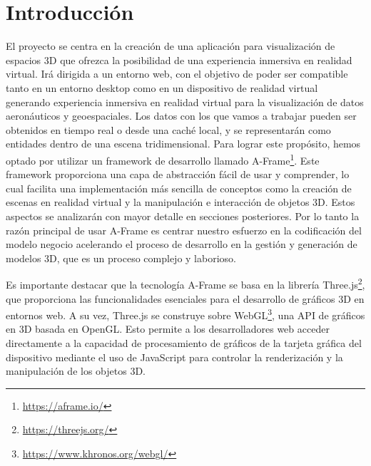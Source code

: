 \documentclass[a4paper, 11pt]{book}
\begin{document}

\cleardoublepage
\chapter{Introducción}
\label{sec:intro} %
El proyecto se centra en la creación de una aplicación para visualización de espacios 3D que ofrezca la posibilidad de una experiencia inmersiva en realidad virtual. Irá dirigida a un entorno web, con el objetivo de poder ser compatible tanto en un entorno desktop como en un dispositivo de realidad virtual generando experiencia inmersiva en realidad virtual para la visualización de datos aeronáuticos y geoespaciales. 
Los datos con los que vamos a trabajar pueden ser obtenidos en tiempo real o desde una caché local, y se representarán como entidades dentro de una escena tridimensional.
Para lograr este propósito, hemos optado por utilizar un \Gls{framework} de desarrollo llamado A-Frame\footnote{\url{https://aframe.io/}}. Este framework proporciona una capa de abstracción fácil de usar y comprender, lo cual facilita una implementación más sencilla de conceptos como la creación de escenas en realidad virtual y la manipulación e interacción de objetos 3D. Estos aspectos se analizarán con mayor detalle en secciones posteriores. Por lo tanto la razón principal de usar A-Frame es centrar nuestro esfuerzo en la codificación del modelo negocio acelerando el proceso de desarrollo en la gestión y generación de modelos 3D, que es un proceso complejo y laborioso.

Es importante destacar que la tecnología A-Frame se basa en la librería Three.js\footnote{\url{https://threejs.org/}}, que proporciona las funcionalidades esenciales para el desarrollo de gráficos 3D en entornos web. A su vez, Three.js se construye sobre WebGL\footnote{\url{https://www.khronos.org/webgl/}}, una \Gls{API} de gráficos en 3D basada en OpenGL. Esto permite a los desarrolladores web acceder directamente a la capacidad de procesamiento de gráficos de la tarjeta gráfica del dispositivo mediante el uso de JavaScript para controlar la renderización y la manipulación de los objetos 3D.
\end{document}
